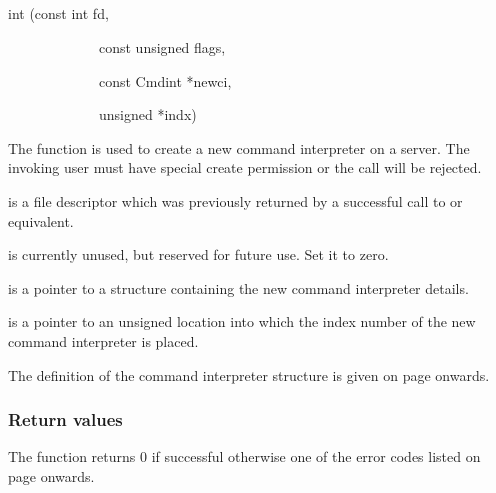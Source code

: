 \subsection{\funcnameXBciadd{}}

\begin{expara}

int \funcnameXBciadd{}(const int fd,

\ \ \ \ \ \ \ \ \ \ \ \ \ const unsigned flags,

\ \ \ \ \ \ \ \ \ \ \ \ \ const Cmdint *newci,

\ \ \ \ \ \ \ \ \ \ \ \ \ unsigned *indx)

\end{expara}

The function \funcXBciadd{} is used to create a new
command interpreter on a \ProductName{} server. The
invoking user must have special create permission or the call will be
rejected.

 is a file descriptor which was previously
returned by a successful call to \funcXBopen{} or equivalent.

 is currently unused, but reserved for
future use. Set it to zero.

 is a pointer to a structure containing the
new command interpreter details.

 is a pointer to an unsigned location into
which the index number of the new command interpreter is placed.

The definition of the command interpreter structure is given on page
\pageref{bkm:Cmdinterp} onwards.

\subsubsection{Return values}
The function returns 0 if successful otherwise one of the error codes
listed on page \pageref{errorcodes} onwards.

